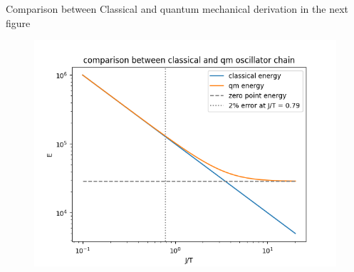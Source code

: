 	Comparison between Classical and quantum mechanical derivation in the next figure
	\begin{figure}[htp]
		\centering
		\includegraphics[width=13cm]{graphics/qmvsclassical.png}
	\end{figure}
	

